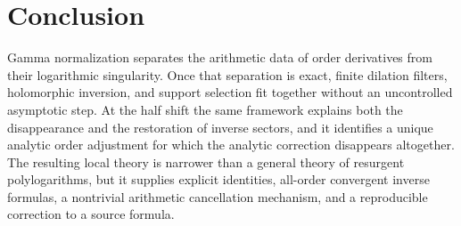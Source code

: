 \documentclass[11pt,a4paper]{article}
\numberwithin{equation}{section}
\theoremstyle{definition}\newtheorem{definition}[theorem]{Definition}
\theoremstyle{remark}\newtheorem{remark}[theorem]{Remark}
\begin{document}
\section*{Conclusion}

Gamma normalization separates the arithmetic data of order derivatives from their logarithmic singularity. Once that separation is exact, finite dilation filters, holomorphic inversion, and support selection fit together without an uncontrolled asymptotic step. At the half shift the same framework explains both the disappearance and the restoration of inverse sectors, and it identifies a unique analytic order adjustment for which the analytic correction disappears altogether. The resulting local theory is narrower than a general theory of resurgent polylogarithms, but it supplies explicit identities, all-order convergent inverse formulas, a nontrivial arithmetic cancellation mechanism, and a reproducible correction to a source formula.
\end{document}
